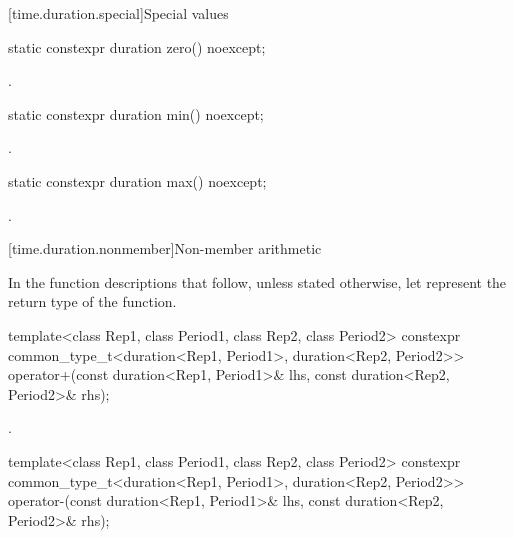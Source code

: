 [time.duration.special]{Special values}

%
\begin{itemdecl}
static constexpr duration zero() noexcept;
\end{itemdecl}

\begin{itemdescr}
\pnum
\returns
{}.
\end{itemdescr}

%
\begin{itemdecl}
static constexpr duration min() noexcept;
\end{itemdecl}

\begin{itemdescr}
\pnum
\returns
{}.
\end{itemdescr}

%
\begin{itemdecl}
static constexpr duration max() noexcept;
\end{itemdecl}

\begin{itemdescr}
\pnum
\returns
{}.
\end{itemdescr}

[time.duration.nonmember]{Non-member arithmetic}

\pnum
In the function descriptions that follow, unless stated otherwise,
let  represent the return type of the function.

%
\begin{itemdecl}
template<class Rep1, class Period1, class Rep2, class Period2>
  constexpr common_type_t<duration<Rep1, Period1>, duration<Rep2, Period2>>
    operator+(const duration<Rep1, Period1>& lhs, const duration<Rep2, Period2>& rhs);
\end{itemdecl}

\begin{itemdescr}
\pnum
\returns
{}.
\end{itemdescr}

%
\begin{itemdecl}
template<class Rep1, class Period1, class Rep2, class Period2>
  constexpr common_type_t<duration<Rep1, Period1>, duration<Rep2, Period2>>
    operator-(const duration<Rep1, Period1>& lhs, const duration<Rep2, Period2>& rhs);
\end{itemdecl}

